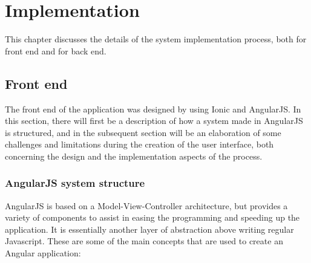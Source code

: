 
\chapter{Implementation}

This chapter discusses the details of the system implementation process, both for front end and for back end.

\section{Front end}

The front end of the application was designed by using Ionic and AngularJS. In this section, there will first be a description of how a system made in AngularJS is structured, and in the subsequent section will be an elaboration of some challenges and limitations during the creation of the user interface, both concerning the design and the implementation aspects of the process.

\subsection{AngularJS system structure}

AngularJS is based on a Model-View-Controller architecture, but provides a variety of components to assist in easing the programming and speeding up the application. It is essentially another layer of abstraction above writing regular Javascript. These are some of the main concepts that are used to create an Angular application:

